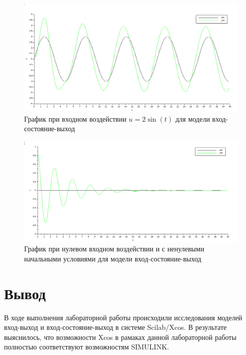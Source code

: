 \documentclass[12pt, a4paper] {ncc}
\begin{document}
		\begin{figure}[ht]
    		\includegraphics[scale=0.4]{./plotiossin.png}
			\caption{График при входном воздействии $u = 2\sin(t)$ для модели вход-состояние-выход}
		\end{figure}

		\begin{figure}[ht]
    		\includegraphics[scale=0.4]{./plotiosfree.png}
			\caption{График при нулевом входном воздействии и с ненулевыми начальными условиями для модели вход-состояние-выход}
		\end{figure}


    \section{Вывод}

        В ходе выполнения лабораторной работы происходили исследования моделей вход-выход и вход-состояние-выход в
        системе Scilab/Xcos. В результате выяснилось, что возможности Xcos в рамаках данной лабораторной работы
        полностью соответствуют возможностям SIMULINK.
\end{document}
